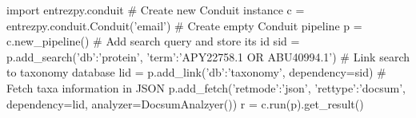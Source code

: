 \begin{python}[basicstyle=\smaller\ttfamily]
  import entrezpy.conduit
  # Create new Conduit instance
  c = entrezpy.conduit.Conduit('email')
  # Create empty Conduit pipeline
  p = c.new_pipeline()
  # Add search query and store its id
  sid = p.add_search({'db':'protein', 'term':'APY22758.1 OR ABU40994.1'})
  # Link search to taxonomy database
  lid = p.add_link({'db':'taxonomy'}, dependency=sid)
  # Fetch taxa information in JSON
  p.add_fetch({'retmode':'json', 'rettype':'docsum'}, dependency=lid, analyzer=DocsumAnalzyer())
  r = c.run(p).get_result()
\end{python}
